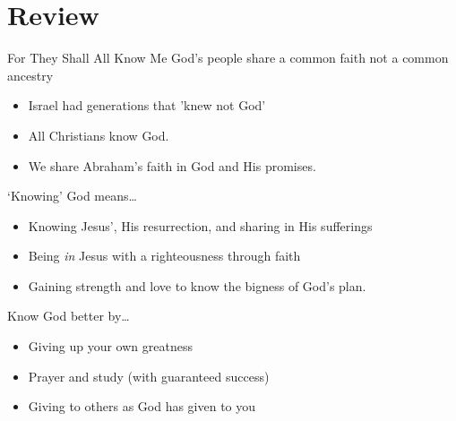 \section{Review}

\begin{frame}{For They Shall All Know Me}
	God's people share a common faith not a common ancestry 
	\begin{itemize}
		\item Israel had generations that 'knew not God'
		\item All Christians know God. 
		\item We share Abraham's faith in God and His promises.
	\end{itemize}
	`Knowing' God means\ldots
	\begin{itemize}
		\item Knowing Jesus', His resurrection, and sharing in His sufferings
		\item Being \emph{in} Jesus with a righteousness through faith
		\item Gaining strength and love to know the bigness of God's plan.
	\end{itemize}
	Know God better by\ldots
	\begin{itemize}
		\item Giving up your own greatness
		\item Prayer and study (with guaranteed success)
		\item Giving to others as God has given to you
	\end{itemize}
\end{frame}